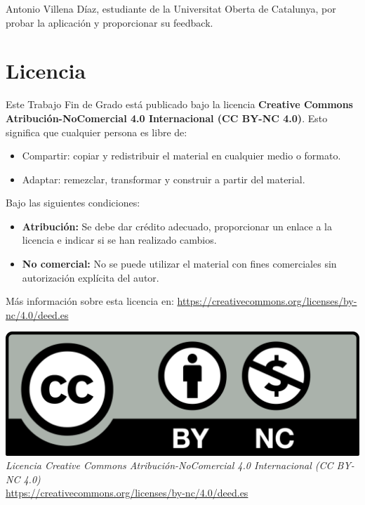 \vspace{1cm}

Antonio Villena Díaz, estudiante de la Universitat Oberta de Catalunya, por probar la aplicación y proporcionar su feedback.


\chapter*{Licencia}

Este Trabajo Fin de Grado está publicado bajo la licencia \textbf{Creative Commons Atribución-NoComercial 4.0 Internacional (CC BY-NC 4.0)}.  
Esto significa que cualquier persona es libre de:

\begin{itemize}
	\item Compartir: copiar y redistribuir el material en cualquier medio o formato.
	\item Adaptar: remezclar, transformar y construir a partir del material.
\end{itemize}

Bajo las siguientes condiciones:

\begin{itemize}
	\item \textbf{Atribución:} Se debe dar crédito adecuado, proporcionar un enlace a la licencia e indicar si se han realizado cambios.
	\item \textbf{No comercial:} No se puede utilizar el material con fines comerciales sin autorización explícita del autor.
\end{itemize}

Más información sobre esta licencia en: \url{https://creativecommons.org/licenses/by-nc/4.0/deed.es}


\begin{center}
	\includegraphics[width=1\textwidth]{imagenes/licencia.png} \\
	\vspace{0.5em}
	\textit{Licencia Creative Commons Atribución-NoComercial 4.0 Internacional (CC BY-NC 4.0)} \\
	\url{https://creativecommons.org/licenses/by-nc/4.0/deed.es}
\end{center}

